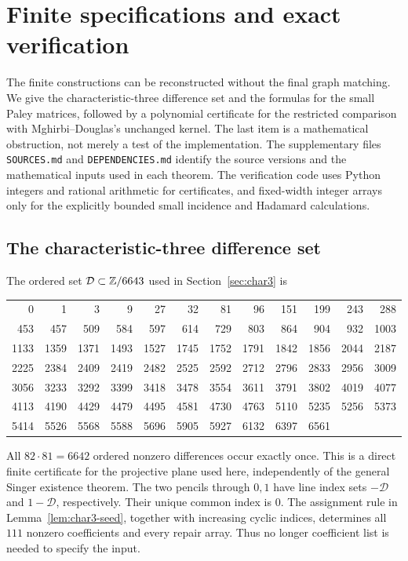 \section{Finite specifications and exact verification}\label{app:certificates}
The finite constructions can be reconstructed without the final graph matching. We give the characteristic-three difference set and the formulas for the small Paley matrices, followed by a polynomial certificate for the restricted comparison with Mghirbi--Douglas's unchanged kernel. The last item is a mathematical obstruction, not merely a test of the implementation. The supplementary files \texttt{SOURCES.md} and \texttt{DEPENDENCIES.md} identify the source versions and the mathematical inputs used in each theorem. The verification code uses Python integers and rational arithmetic for certificates, and fixed-width integer arrays only for the explicitly bounded small incidence and Hadamard calculations.

\subsection{The characteristic-three difference set}
The ordered set $\mathcal D\subset\mathbb Z/6643$ used in Section~\ref{sec:char3} is
\begin{center}
\small
\begin{tabular}{rrrrrrrrrrrr}
0&1&3&9&27&32&81&96&151&199&243&288\\
453&457&509&584&597&614&729&803&864&904&932&1003\\
1133&1359&1371&1493&1527&1745&1752&1791&1842&1856&2044&2187\\
2225&2384&2409&2419&2482&2525&2592&2712&2796&2833&2956&3009\\
3056&3233&3292&3399&3418&3478&3554&3611&3791&3802&4019&4077\\
4113&4190&4429&4479&4495&4581&4730&4763&5110&5235&5256&5373\\
5414&5526&5568&5588&5696&5905&5927&6132&6397&6561&&\\
\end{tabular}
\end{center}
All $82\cdot81=6642$ ordered nonzero differences occur exactly once. This is a direct finite certificate for the projective plane used here, independently of the general Singer existence theorem. The two pencils through $0,1$ have line index sets $-\mathcal D$ and $1-\mathcal D$, respectively. Their unique common index is $0$. The assignment rule in Lemma~\ref{lem:char3-seed}, together with increasing cyclic indices, determines all $111$ nonzero coefficients and every repair array. Thus no longer coefficient list is needed to specify the input.

